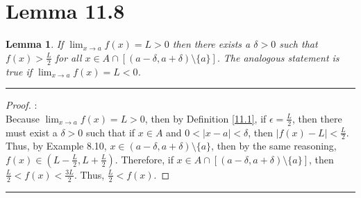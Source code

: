 \documentclass[openany, amssymb, psamsfonts]{amsart}
\newcommand{\sm}{\setminus}
\newtheorem{lem}{Lemma}[section]
\theoremstyle{definition}
\numberwithin{equation}{section}
\begin{document}
\section*{Lemma 11.8}
\begin{lem} \label{11.8}
 If $\displaystyle \lim_{x\to a} f(x)=L>0$ then there exists a $\delta>0$ such that $f(x)>\frac{L}{2}$ for all
$x\in A \cap [(a-\delta,a+\delta)\setminus\{a\}].$  The analogous statement is true if $\displaystyle \lim_{x\to a} f(x)=L< 0$. 
\end{lem}
\vspace{4pt}     \hrule   \vspace{4pt}\begin{proof}:\\
Because $\displaystyle \lim_{x\to a} f(x)=L> 0$, then by Definition \ref{11.1}, if $\epsilon = \frac{L}{2}$, then there must exist a $\delta >0$ such that if $x\in A$ and $0<|x-a|<\delta$, then $|f(x) - L|<\frac{L}{2}$. Thus, by Example 8.10, $x\in (a-\delta, a+ \delta)\setminus \{a\}$, then by the same reasoning, $f(x) \in (L-\frac{L}{2}, L+\frac{L}{2})$. Therefore, if $x\in A \cap [(a-\delta, a+ \delta)\sm \{a\}]$, then $\frac{L}{2}<f(x) < \frac{3L}{2}$. Thus, $\frac{L}{2}<f(x)$.
\end{proof} \vspace{4pt}     \hrule   \vspace{4pt}
\end{document}
